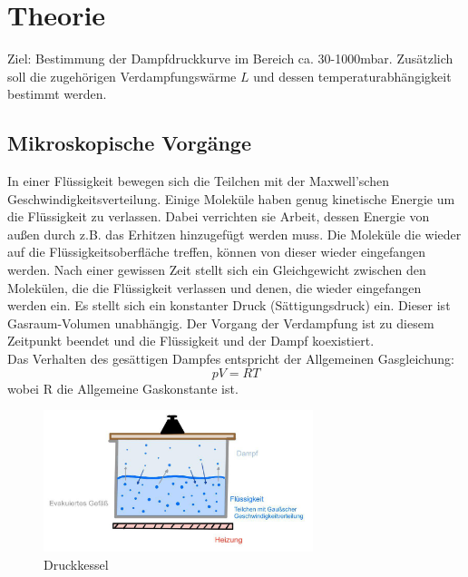 \section{Theorie}
\label{sec:theorie}
Ziel: Bestimmung der Dampfdruckkurve im Bereich ca. 30-1000mbar.
Zusätzlich soll die zugehörigen Verdampfungswärme $L$ und dessen temperaturabhängigkeit bestimmt werden.\\

\subsection{Mikroskopische Vorgänge}
In einer Flüssigkeit bewegen sich die Teilchen mit der Maxwell'schen Geschwindigkeitsverteilung.
Einige Moleküle haben genug kinetische Energie um die Flüssigkeit zu verlassen.
Dabei verrichten sie Arbeit, dessen Energie von außen durch z.B. das Erhitzen hinzugefügt werden muss.
Die Moleküle die wieder auf die Flüssigkeitsoberfläche treffen, können von dieser wieder eingefangen werden.
Nach einer gewissen Zeit stellt sich ein Gleichgewicht zwischen den Molekülen, die die Flüssigkeit verlassen und denen,
die wieder eingefangen werden ein.
Es stellt sich ein konstanter Druck (Sättigungsdruck) ein. Dieser ist Gasraum-Volumen unabhängig. 
Der Vorgang der Verdampfung ist zu diesem Zeitpunkt beendet und
die Flüssigkeit und der Dampf koexistiert.\\
Das Verhalten des gesättigen Dampfes entspricht der Allgemeinen Gasgleichung:
\begin{equation}
    pV=RT
    \label{eqn:gasgl}
\end{equation}
wobei R die Allgemeine Gaskonstante ist.

\begin{figure}
    \centering
    \includegraphics[width=0.7\textwidth]{bilder/kessel.jpg}
    \caption{Druckkessel}
    \label{fig:kessel}
\end{figure}

